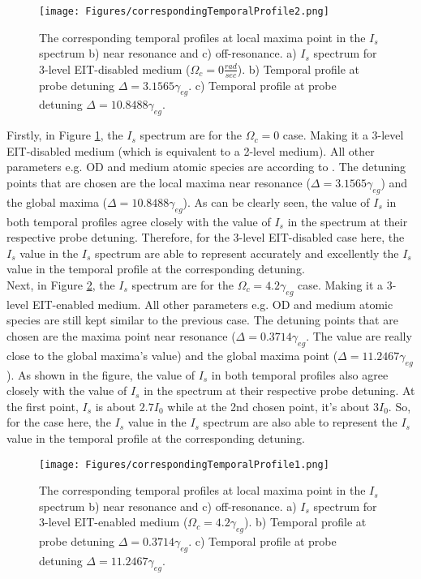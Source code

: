 \newpage

\begin{figure}[h!]
    \centering
    \texttt{[image: Figures/correspondingTemporalProfile2.png]}
    \caption{The corresponding temporal profiles at local maxima point in the $I_{s}$ spectrum b) near resonance and c) off-resonance. a) $I_{s}$ spectrum for 3-level EIT-disabled medium ($\Omega_{c} = 0 \frac{rad}{sec}$). b)  Temporal profile at probe detuning $\Delta = 3.1565\gamma_{eg}$. c) Temporal profile at probe detuning $\Delta = 10.8488\gamma_{eg}$.}
    \label{fig: corresponding temporal profile 1}
\end{figure}

Firstly, in Figure \ref{fig: corresponding temporal profile 1}, the $I_{s}$ spectrum are for the $\Omega_{c} = 0$ case. Making it a 3-level EIT-disabled medium (which is equivalent to a 2-level medium). All other parameters e.g. OD and medium atomic species are according to \cite{jeong2010slow}. The detuning points that are chosen are the local maxima near resonance ($\Delta = 3.1565\gamma_{eg}$) and the global maxima ($\Delta = 10.8488\gamma_{eg}$). As can be clearly seen, the value of $I_{s}$ in both temporal profiles agree closely with the value of $I_{s}$ in the spectrum at their respective probe detuning. Therefore, for the 3-level EIT-disabled case here, the $I_{s}$ value in the $I_{s}$ spectrum are able to represent accurately and excellently the $I_{s}$ value in the temporal profile at the corresponding detuning.\\

Next, in Figure \ref{fig: corresponding temporal profile 2}, the $I_{s}$ spectrum are for the $\Omega_{c} = 4.2\gamma_{eg}$ case. Making it a 3-level EIT-enabled medium. All other parameters e.g. OD and medium atomic species are still kept similar to the previous case. The detuning points that are chosen are the maxima point near resonance ($\Delta = 0.3714\gamma_{eg}$. The value are really close to the global maxima's value) and the global maxima point ($\Delta = 11.2467\gamma_{eg}$). As shown in the figure, the value of $I_{s}$ in both temporal profiles also agree closely with the value of $I_{s}$ in the spectrum at their respective probe detuning. At the first point, $I_{s}$ is about $2.7I_{0}$ while at the 2nd chosen point, it's about $3I_{0}$. So, for the case here, the $I_{s}$ value in the $I_{s}$ spectrum are also able to represent the $I_{s}$ value in the temporal profile at the corresponding detuning.

\begin{figure}[h!]
    \centering
     \texttt{[image: Figures/correspondingTemporalProfile1.png]}
    \caption{The corresponding temporal profiles at local maxima point in the $I_{s}$ spectrum b) near resonance and c) off-resonance. a) $I_{s}$ spectrum for 3-level EIT-enabled medium ($\Omega_{c} = 4.2\gamma_{eg}$). b) Temporal profile at probe detuning $\Delta = 0.3714\gamma_{eg}$. c) Temporal profile at probe detuning $\Delta = 11.2467\gamma_{eg}$.}
    \label{fig: corresponding temporal profile 2}
\end{figure}

